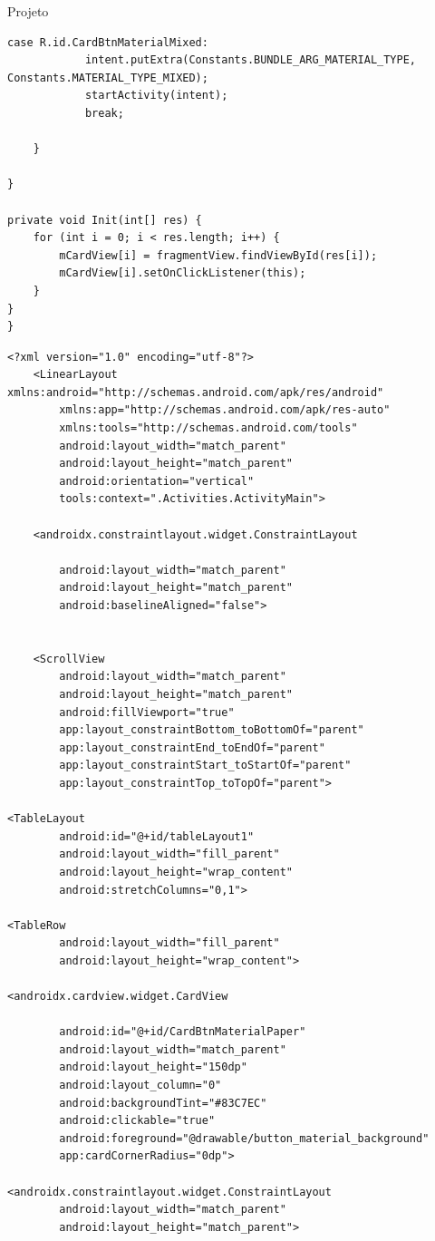 \documentclass[
	12pt,				%
	openright,			%
	twoside,			%
	a4paper,			%
	english,			%
	french,				%
	spanish,			%
	brazil				%
	]{abntex2}
\begin{document}
\begin{chapter}{Projeto}
\begin{lstlisting}[numbers=none,
basicstyle=\small,
caption={FragmentMaterialMenu.java},
title={FragmentMaterialMenu.java},
label={FragmentMaterialMenu.java}]
		case R.id.CardBtnMaterialMixed:
			intent.putExtra(Constants.BUNDLE_ARG_MATERIAL_TYPE, Constants.MATERIAL_TYPE_MIXED);
			startActivity(intent);
			break;

	}

}

private void Init(int[] res) {
	for (int i = 0; i < res.length; i++) {
		mCardView[i] = fragmentView.findViewById(res[i]);
		mCardView[i].setOnClickListener(this);
	}
}
}
\end{lstlisting}

\newpage
\begin{lstlisting}[numbers=none,basicstyle=\small,
caption={FragmentMaterialMenu.xml},
title={FragmentMaterialMenu.xml},
label={fragment_material_menu.xml}]
    <?xml version="1.0" encoding="utf-8"?>
    <LinearLayout xmlns:android="http://schemas.android.com/apk/res/android"
		xmlns:app="http://schemas.android.com/apk/res-auto"
		xmlns:tools="http://schemas.android.com/tools"
		android:layout_width="match_parent"
		android:layout_height="match_parent"
		android:orientation="vertical"
		tools:context=".Activities.ActivityMain">

    <androidx.constraintlayout.widget.ConstraintLayout

		android:layout_width="match_parent"
		android:layout_height="match_parent"
		android:baselineAligned="false">


    <ScrollView
		android:layout_width="match_parent"
		android:layout_height="match_parent"
		android:fillViewport="true"
		app:layout_constraintBottom_toBottomOf="parent"
		app:layout_constraintEnd_toEndOf="parent"
		app:layout_constraintStart_toStartOf="parent"
		app:layout_constraintTop_toTopOf="parent">

<TableLayout
		android:id="@+id/tableLayout1"
		android:layout_width="fill_parent"
		android:layout_height="wrap_content"
		android:stretchColumns="0,1">

<TableRow
		android:layout_width="fill_parent"
		android:layout_height="wrap_content">

<androidx.cardview.widget.CardView

		android:id="@+id/CardBtnMaterialPaper"
		android:layout_width="match_parent"
		android:layout_height="150dp"
		android:layout_column="0"
		android:backgroundTint="#83C7EC"
		android:clickable="true"
		android:foreground="@drawable/button_material_background"
		app:cardCornerRadius="0dp">

<androidx.constraintlayout.widget.ConstraintLayout
		android:layout_width="match_parent"
		android:layout_height="match_parent">


\end{lstlisting}
\end{chapter}
\end{document}
